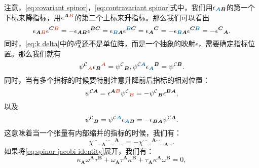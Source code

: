 注意，\ref{eq:covariant spinor}，\ref{eq:contravariant spinor}式中，我们用$\epsilon _{\boldsymbol{\textcolor{roulan}{A} B}}$的第一个下标来\textbf{\textcolor{roulan}{降}}指标，用$\epsilon ^{\boldsymbol{A\textcolor{mulan}{B}}}$的第二个上标来\textbf{\textcolor{mulan}{升}}指标。那么我们可以看出
\begin{equation*}
	\epsilon _{\boldsymbol{A\textcolor{mulan}{B}}} \epsilon ^{\boldsymbol{C\textcolor{mulan}{B}}} =-\epsilon _{\boldsymbol{AB}} \epsilon ^{\boldsymbol{BC}} =\epsilon _{\boldsymbol{\textcolor{roulan}{B} A}} \epsilon ^{\boldsymbol{\textcolor{roulan}{B} C}} =\epsilon \boldsymbol{{_{A}}^{C}} =-\epsilon _{\boldsymbol{\textcolor{roulan}{B} A}} \epsilon ^{\boldsymbol{C\textcolor{roulan}{B}}} =-\epsilon \boldsymbol{^{C}{}}_{\boldsymbol{A}} .
\end{equation*}
同时，\ref{eq:k delta}中的$\delta \boldsymbol{_{A}^{B}}$还不是单位阵，而是一个抽象的映射$\epsilon $，需要确定指标位置。那么我们就有
\begin{equation*}
	\psi ^{\mathcal{C}}{}_{\boldsymbol{\textcolor{mulan}{A}}} \epsilon {_{\boldsymbol{B}}}^{\boldsymbol{\textcolor{mulan}{A}}} =\psi ^{\mathcal{C}}{}_{\boldsymbol{B}} ,\psi ^{\mathcal{C}\boldsymbol{\textcolor{roulan}{A}}} \epsilon \textcolor{roulan}{{_{\boldsymbol{A}}}}^{\boldsymbol{B}} =\psi ^{\mathcal{C}\boldsymbol{B}} .
\end{equation*}
同时，当有多个指标的时候要特别注意升降前后指标的相对位置：
\begin{equation*}
	\psi ^{\mathcal{C}\boldsymbol{A}} =\epsilon ^{\boldsymbol{A\textcolor{mulan}{B}}} \psi ^{\mathcal{C}}{}\textcolor{mulan}{_{\boldsymbol{B}}} =-\psi ^{\mathcal{C}}{}_{\boldsymbol{B}} \epsilon ^{\boldsymbol{BA}} ,
\end{equation*}
以及
\begin{equation*}
	\psi ^{\mathcal{C}}{}_{\boldsymbol{B}} =\psi ^{\mathcal{C}\boldsymbol{\textcolor{roulan}{A}}} \epsilon _{\boldsymbol{\textcolor{roulan}{A} B}} =-\epsilon _{\boldsymbol{BA}} \psi ^{\mathcal{C}\boldsymbol{A}} .
\end{equation*}
这意味着当一个张量有内部缩并的指标的时候，我们有：
\begin{equation*}
	\chi ^{\cdots }{}{_{\cdots \boldsymbol{A}}}^{\cdots }{}{_{\cdots }}^{\boldsymbol{A}}{}_{\cdots } =-\chi ^{\cdots }{}{_{\cdots }}^{\boldsymbol{A} \cdots }{}_{\cdots \boldsymbol{A} \cdots } .
\end{equation*}
如果将\ref{eq:spinor jacobi identity}展开，我们有：
\begin{equation*}
	\kappa _{\boldsymbol{A}} \omega ^{\boldsymbol{A}} \tau ^{\boldsymbol{B}} +\omega _{\boldsymbol{A}} \tau ^{\boldsymbol{A}} \kappa ^{\boldsymbol{B}} +\tau _{\boldsymbol{A}} \kappa ^{\boldsymbol{A}} \omega ^{\boldsymbol{B}} =0,
\end{equation*}
